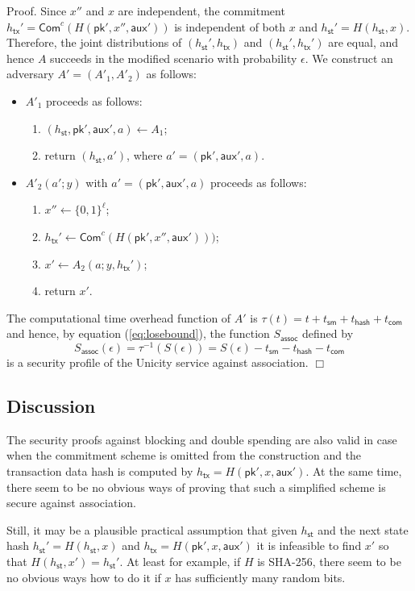 \documentclass{article}
\newenvironment{proof}{\textsf{Proof}.}{\hfill$\Box$}
\newcommand{\pubkey}[0]{\mathsf{pk}}
\newcommand{\commitc}[0]{\mathsf{Com}^{c}}
\newcommand{\sthash}[0]{h_\mathsf{st}}
\newcommand{\txhash}[0]{h_\mathsf{tx}}
\newcommand{\auxd}[0]{\mathsf{aux}}
\begin{document}
\begin{proof}
Since $x''$ and $x$ are independent, the commitment $\txhash'=\commitc(H(\pubkey',x'',\auxd'))$ is independent of both $x$ and $\sthash'=H(\sthash,x)$. Therefore, the joint distributions of $(\sthash',\txhash)$ and $(\sthash',\txhash')$ are equal, and hence $A$ succeeds in the modified scenario with probability $\epsilon$. We construct an adversary $A'=(A'_1,A'_2)$ as follows:
\begin{itemize}
\item $A'_1$ proceeds as follows:
\begin{enumerate}
\item $(\sthash, \pubkey', \auxd', a)\gets A_1$;
\item return $(\sthash, a')$, where $a'=(\pubkey', \auxd', a)$.
\end{enumerate}
\item $A'_2(a';y)$ with $a'=(\pubkey', \auxd', a)$ proceeds as follows:
\begin{enumerate}
\item $x''\gets \{0,1\}^\ell$;
\item $\txhash'\gets\commitc(H(\pubkey',x'',\auxd')))$;
\item $x'\gets A_2(a; y,\txhash')$;
\item return $x'$.
\end{enumerate}
\end{itemize}

\noindent The computational time overhead function of $A'$ is $\tau(t) = t + t_\mathsf{sm} + t_\mathsf{hash} + t_\mathsf{com}$ and hence, by equation (\ref{eq:losebound}), the function $S_\mathsf{assoc}$ defined by
\[
S_\mathsf{assoc}(\epsilon) = \tau^{-1}(S(\epsilon)) = S(\epsilon) - t_\mathsf{sm} - t_\mathsf{hash} - t_\mathsf{com}
\]
is a security profile of the Unicity service against association.
\end{proof}

\subsection{Discussion}

The security proofs against blocking and double spending are also valid in case when the commitment scheme is omitted from the construction and the transaction data hash is computed by $\txhash = H(\pubkey',x,\auxd')$.
At the same time, there seem to be no obvious ways of proving that such a simplified scheme is secure against association.

Still, it may be a plausible practical assumption that given $\sthash$ and the next state hash $\sthash'=H(\sthash,x)$ and $\txhash = H(\pubkey',x,\auxd')$ it is infeasible to find $x'$ so that $H(\sthash,x')=\sthash'$. At least for example, if $H$ is \textsf{SHA-256}, there seem to be no obvious ways how to do it if $x$ has sufficiently many random bits.
\end{document}
